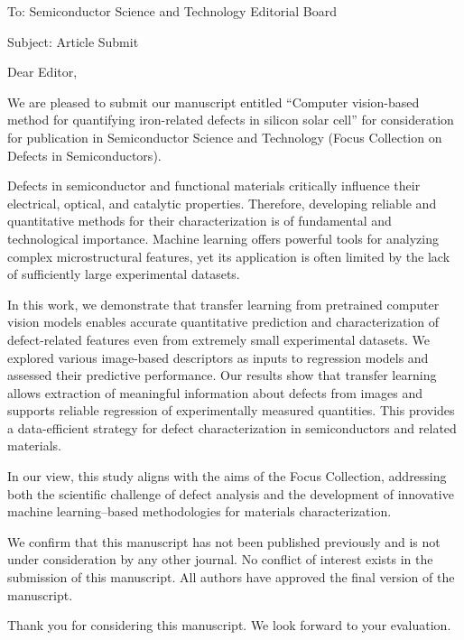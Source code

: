 \documentclass[preprint]{elsarticle}
\begin{document}
To:
Semiconductor Science and Technology Editorial Board


Subject:
Article Submit

\vspace{5mm}
Dear Editor,

\vspace{3mm}
We are pleased to submit our manuscript entitled
“Computer vision-based method for quantifying iron-related defects in silicon solar cell”
for consideration for publication in Semiconductor Science and Technology
(Focus Collection on Defects in Semiconductors).


Defects in semiconductor and functional materials critically influence their electrical, optical, and catalytic properties. 
Therefore, developing reliable and quantitative methods for their characterization is of fundamental and technological importance. 
Machine learning offers powerful tools for analyzing complex microstructural features, 
yet its application is often limited by the lack of sufficiently large experimental datasets.

In this work, we demonstrate that transfer learning from pretrained computer vision models 
enables accurate quantitative prediction and characterization of defect-related features 
even from extremely small experimental datasets. 
We explored various image-based descriptors as inputs to regression models and assessed their predictive performance. 
Our results show that transfer learning allows extraction of meaningful information 
about defects from images and supports reliable regression of experimentally measured quantities. 
This provides a data-efficient strategy for defect characterization in semiconductors and related materials.

In our view, this study aligns with the aims of the Focus Collection, 
addressing both the scientific challenge of defect analysis 
and the development of innovative machine learning–based methodologies for materials characterization.


We confirm that this manuscript has not been published previously 
and is not under consideration by any other journal. 
No conflict of interest exists in the submission of this manuscript.
All authors have approved the final version of the manuscript.

Thank you for considering this manuscript. We look forward to your evaluation.

\end{document}
